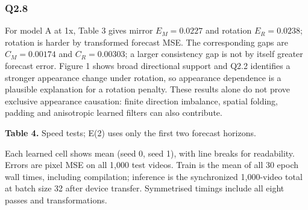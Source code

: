 \documentclass[
  10pt,
  a4paper,
]{article}
\begin{document}
\subsubsection{Q2.8}\label{q2.8}

For model A at 1x, Table 3 gives mirror \(E_M=0.0227\) and rotation
\(E_R=0.0238\); rotation is harder by transformed forecast MSE. The
corresponding gaps are \(C_M=0.00174\) and \(C_R=0.00303\); a larger
consistency gap is not by itself greater forecast error. Figure 1 shows
broad directional support and Q2.2 identifies a stronger appearance
change under rotation, so appearance dependence is a plausible
explanation for a rotation penalty. These results alone do not prove
exclusive appearance causation: finite direction imbalance, spatial
folding, padding and anisotropic learned filters can also contribute.

\textbf{Table 4.} Speed tests; E(2) uses only the first two forecast
horizons.

\begin{center}
\small
\setlength{\tabcolsep}{5pt}
\end{center}

Each learned cell shows mean (seed 0, seed 1), with line breaks for
readability. Errors are pixel MSE on all 1,000 test videos. Train is the
mean of all 30 epoch wall times, including compilation; inference is the
synchronized 1,000-video total at batch size 32 after device transfer.
Symmetrised timings include all eight passes and transformations.
\end{document}
